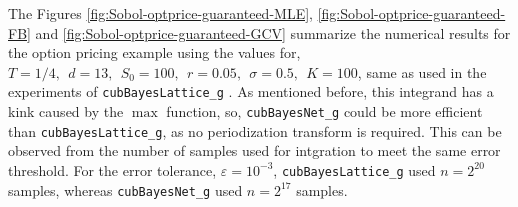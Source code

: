 \documentclass[graybox,footinfo]{svmult}
\newcommand{\code}[1]{\texttt{#1}}
\begin{document}
{{{{{{%
The Figures \ref{fig:Sobol-optprice-guaranteed-MLE}, \ref{fig:Sobol-optprice-guaranteed-FB} and 
\ref{fig:Sobol-optprice-guaranteed-GCV} summarize the numerical results for the option pricing example using the values for,
$
T = 1/4, \ \ d = 13, \ \ S_0 = 100, \ \ r =  0.05, \ \ \sigma = 0.5, \ \ K = 100
$, same as used in the experiments of \code{cubBayesLattice\_g} \cite{RatHic19a}.
As mentioned before, this integrand has a kink caused by the $\max$ function, so, \code{cubBayesNet\_g} could be more efficient than \code{cubBayesLattice\_g}, as no periodization transform is required. This can be observed from the number of samples used for intgration to meet the same error threshold. For the error tolerance, $\varepsilon=10^{-3}$,  \code{cubBayesLattice\_g} used $n=2^{20}$ samples, whereas \code{cubBayesNet\_g} used $n=2^{17}$ samples.


}}}}}}
\end{document}
